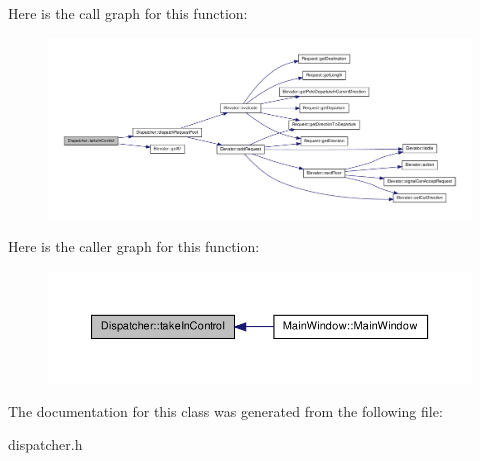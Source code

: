 Here is the call graph for this function:\nopagebreak
\begin{figure}[H]
\begin{center}
\leavevmode
\includegraphics[width=400pt]{class_dispatcher_a95437a6831a0f727a64d8490cf65a49f_cgraph}
\end{center}
\end{figure}




Here is the caller graph for this function:\nopagebreak
\begin{figure}[H]
\begin{center}
\leavevmode
\includegraphics[width=386pt]{class_dispatcher_a95437a6831a0f727a64d8490cf65a49f_icgraph}
\end{center}
\end{figure}




The documentation for this class was generated from the following file:\begin{DoxyCompactItemize}
\item 
dispatcher.h\end{DoxyCompactItemize}
